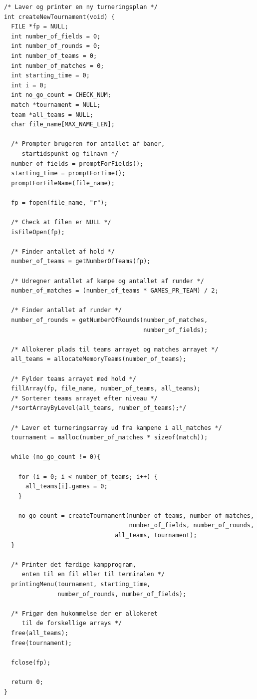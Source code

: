 \begin{listing}[H]
\begin{verbatim}
/* Laver og printer en ny turneringsplan */
int createNewTournament(void) {
  FILE *fp = NULL;
  int number_of_fields = 0;
  int number_of_rounds = 0;
  int number_of_teams = 0;
  int number_of_matches = 0;
  int starting_time = 0;
  int i = 0;
  int no_go_count = CHECK_NUM;
  match *tournament = NULL;
  team *all_teams = NULL;
  char file_name[MAX_NAME_LEN];

  /* Prompter brugeren for antallet af baner, 
     startidspunkt og filnavn */
  number_of_fields = promptForFields();
  starting_time = promptForTime();
  promptForFileName(file_name);

  fp = fopen(file_name, "r");

  /* Check at filen er NULL */
  isFileOpen(fp);

  /* Finder antallet af hold */
  number_of_teams = getNumberOfTeams(fp);

  /* Udregner antallet af kampe og antallet af runder */
  number_of_matches = (number_of_teams * GAMES_PR_TEAM) / 2;

  /* Finder antallet af runder */
  number_of_rounds = getNumberOfRounds(number_of_matches, 
                                       number_of_fields);

  /* Allokerer plads til teams arrayet og matches arrayet */
  all_teams = allocateMemoryTeams(number_of_teams);

  /* Fylder teams arrayet med hold */
  fillArray(fp, file_name, number_of_teams, all_teams);
  /* Sorterer teams arrayet efter niveau */
  /*sortArrayByLevel(all_teams, number_of_teams);*/

  /* Laver et turneringsarray ud fra kampene i all_matches */
  tournament = malloc(number_of_matches * sizeof(match));

  while (no_go_count != 0){

    for (i = 0; i < number_of_teams; i++) {
      all_teams[i].games = 0;
    }

    no_go_count = createTournament(number_of_teams, number_of_matches, 
                                   number_of_fields, number_of_rounds, 
                               all_teams, tournament);
  }

  /* Printer det færdige kampprogram, 
     enten til en fil eller til terminalen */
  printingMenu(tournament, starting_time, 
               number_of_rounds, number_of_fields);

  /* Frigør den hukommelse der er allokeret 
     til de forskellige arrays */
  free(all_teams);
  free(tournament);

  fclose(fp);

  return 0;
}
\end{verbatim}
\label{code:createNewTournament}
\end{listing}

